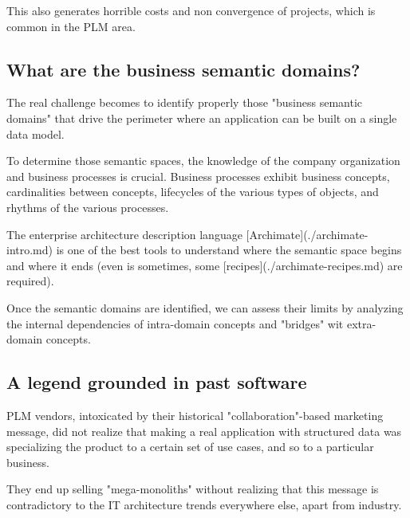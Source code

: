 \documentclass[]{article}
\begin{document}
This also generates horrible costs and non convergence of projects, which is common in the PLM area.

\subsection{What are the business semantic domains?}

The real challenge becomes to identify properly those "business semantic domains" that drive the perimeter where an application can be built on a single data model.

To determine those semantic spaces, the knowledge of the company organization and business processes is crucial. Business processes exhibit business concepts, cardinalities between concepts, lifecycles of the various types of objects, and rhythms of the various processes.

The enterprise architecture description language [Archimate](./archimate-intro.md) is one of the best tools to understand where the semantic space begins and where it ends (even is sometimes, some [recipes](./archimate-recipes.md) are required).

Once the semantic domains are identified, we can assess their limits by analyzing the internal dependencies of intra-domain concepts and "bridges" wit extra-domain concepts.

\subsection{A legend grounded in past software}

PLM vendors, intoxicated by their historical "collaboration"-based marketing message, did not realize that making a real application with structured data was specializing the product to a certain set of use cases, and so to a particular business.

They end up selling "mega-monoliths" without realizing that this message is contradictory to the IT architecture trends everywhere else, apart from industry.

\printbibliography
\end{document}
